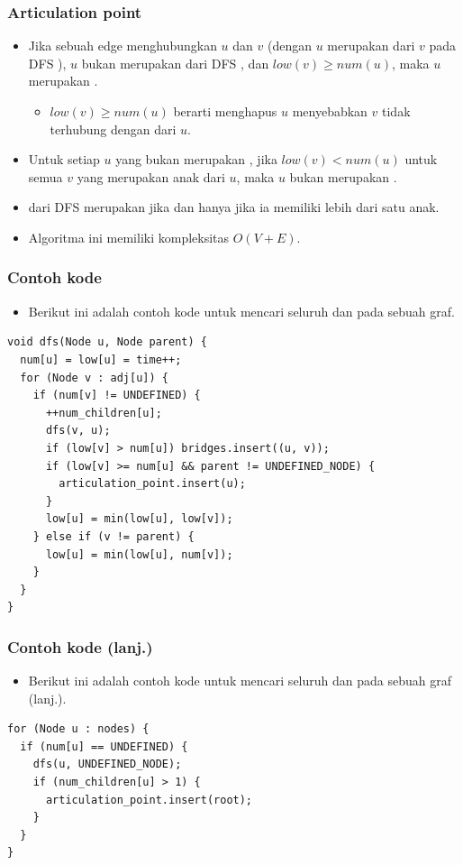 \begin{frame}
\frametitle{Articulation point}
\begin{itemize}
  \item Jika sebuah edge menghubungkan \fnode $u$ dan $v$ (dengan \fnode $u$ merupakan \fparent dari \fnode $v$ pada DFS \ftree), $u$ bukan merupakan \froot dari DFS \ftree, dan $low(v) \ge num(u)$, maka \fnode $u$ merupakan \farticulationpoint.
  \begin{itemize}
    \item $low(v) \ge num(u)$ berarti menghapus \fnode $u$ menyebabkan \fnode $v$ tidak terhubung dengan \fparent dari \fnode $u$.
  \end{itemize}
  \item Untuk setiap \fnode $u$ yang bukan merupakan \froot, jika $low(v) < num(u)$ untuk semua \fnode $v$ yang merupakan anak dari \fnode $u$, maka \fnode $u$ bukan merupakan \farticulationpoint.
  \item \fRoot dari DFS \ftree merupakan \farticulationpoint jika dan hanya jika ia memiliki lebih dari satu anak.
  \item Algoritma ini memiliki kompleksitas $O(V + E)$.
\end{itemize}
\end{frame}

\begin{frame}[fragile]
\frametitle{Contoh kode}
\begin{itemize}
  \item Berikut ini adalah contoh kode untuk mencari seluruh \fbridge dan \farticulationpoint pada sebuah graf.
\end{itemize}
\begin{lstlisting}
void dfs(Node u, Node parent) {
  num[u] = low[u] = time++;
  for (Node v : adj[u]) {
    if (num[v] != UNDEFINED) {
      ++num_children[u];
      dfs(v, u);
      if (low[v] > num[u]) bridges.insert((u, v));
      if (low[v] >= num[u] && parent != UNDEFINED_NODE) {
        articulation_point.insert(u);
      }
      low[u] = min(low[u], low[v]);
    } else if (v != parent) {
      low[u] = min(low[u], num[v]);
    }
  }
}
\end{lstlisting}
\end{frame}

\begin{frame}[fragile]
\frametitle{Contoh kode (lanj.)}
\begin{itemize}
  \item Berikut ini adalah contoh kode untuk mencari seluruh \fbridge dan \farticulationpoint pada sebuah graf (lanj.).
\end{itemize}
\begin{lstlisting}
for (Node u : nodes) {
  if (num[u] == UNDEFINED) {
    dfs(u, UNDEFINED_NODE);
    if (num_children[u] > 1) {
      articulation_point.insert(root);
    }
  }
}
\end{lstlisting}
\end{frame}

